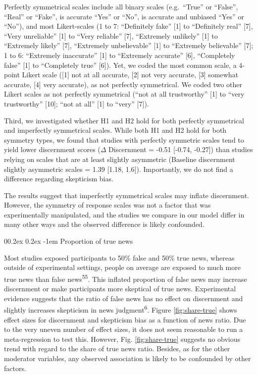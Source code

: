 \documentclass[
  doc,floatsintext]{apa6}
\makeatletter
\let\oldparagraph\paragraph
\renewcommand{\paragraph}{
    \@ifstar
      \xxxParagraphStar
      \xxxParagraphNoStar
  }
\newcommand{\xxxParagraphStar}[1]{\oldparagraph*{#1}\mbox{}}
\newcommand{\xxxParagraphNoStar}[1]{\oldparagraph{#1}\mbox{}}
\renewcommand{\paragraph}{\@startsection{paragraph}{4}{\parindent}%
  {0\baselineskip \@plus 0.2ex \@minus 0.2ex}%
  {-1em}%
  {\normalfont\normalsize\bfseries\itshape\typesectitle}}
\makeatother
\begin{document}
Perfectly symmetrical scales include all binary scales (e.g.~``True'' or ``False'', ``Real'' or ``Fake'', is accurate ``Yes'' or ``No'', is accurate and unbiased ``Yes'' or ``No''), and most Likert-scales (1 to 7: ``Definitely fake'' {[}1{]} to ``Definitely real'' {[}7{]}, ``Very unreliable'' {[}1{]} to ``Very reliable'' {[}7{]}, ``Extremely unlikely'' {[}1{]} to ``Extremely likely'' {[}7{]}, ``Extremely unbelievable'' {[}1{]} to ``Extremely believable'' {[}7{]}; 1 to 6: ``Extremely inaccurate'' {[}1{]} to ``Extremely accurate'' {[}6{]}, ``Completely false'' {[}1{]} to ``Completely true'' {[}6{]}). Yet, we coded the most common scale, a 4-point Likert scale ({[}1{]} not at all accurate, {[}2{]} not very accurate, {[}3{]} somewhat accurate, {[}4{]} very accurate), as not perfectly symmetrical. We coded two other Likert scales as not perfectly symmetrical (``not at all trustworthy'' {[}1{]} to ``very trustworthy'' {[}10{]}; ``not at all'' {[}1{]} to ``very'' {[}7{]}).

Third, we investigated whether H1 and H2 hold for both perfectly symmetrical and imperfectly symmetrical scales. While both H1 and H2 hold for both symmetry types, we found that studies with perfectly symmetric scales tend to yield lower discernment scores (\(\Delta\) Discernment = -0.51 {[}-0.74, -0.27{]}) than studies relying on scales that are at least slightly asymmetric (Baseline discernment slightly asymmetric scales = 1.39 {[}1.18, 1.6{]}). Importantly, we do not find a difference regarding skepticism bias.

The results suggest that imperfectly symmetrical scales may inflate discernment. However, the symmetry of response scales was not a factor that was experimentally manipulated, and the studies we compare in our model differ in many other ways and the observed difference is likely confounded.

\paragraph{Proportion of true news}\label{proportion-of-true-news}

Most studies exposed participants to 50\% false and 50\% true news, whereas outside of experimental settings, people on average are exposed to much more true news than false news\textsuperscript{55}. This inflated proportion of false news may increase discernment or make participants more skeptical of true news. Experimental evidence suggests that the ratio of false news has no effect on discernment and slightly increases skepticism in news judgment\textsuperscript{6}. Figure \ref{fig:share-true} shows effect sizes for discernment and skepticism bias as a function of news ratio. Due to the very uneven number of effect sizes, it does not seem reasonable to run a meta-regression to test this. However, Fig. \ref{fig:share-true} suggests no obvious trend with regard to the share of true news ratio. Besides, as for the other moderator variables, any observed association is likely to be confounded by other factors.
\end{document}
